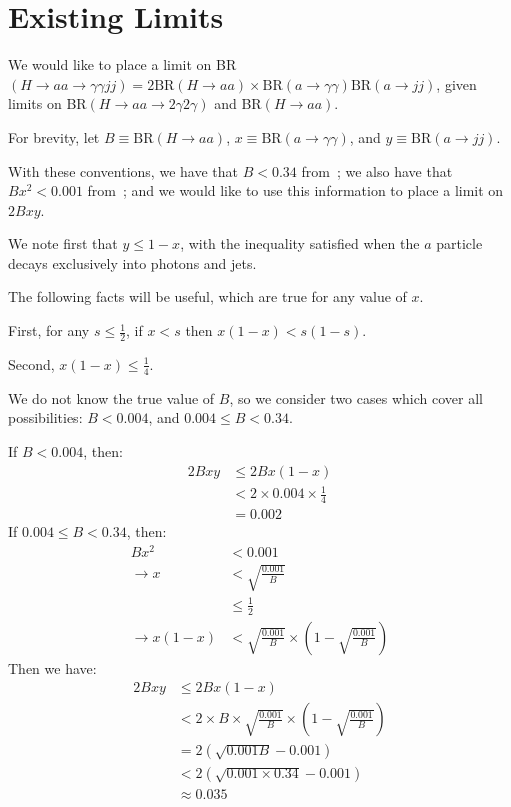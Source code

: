 \section{Existing Limits}
\label{sec:HBSM_app:existinglimits}
We would like to place a limit on BR$(H\rightarrow aa\rightarrow \gamma\gamma jj) = 2\text{BR}(H\rightarrow aa)\times\text{BR}(a\rightarrow\gamma\gamma)\text{BR}(a\rightarrow jj)$,
given limits on BR$(H\rightarrow aa\rightarrow 2\gamma2\gamma)$ and BR$(H\rightarrow aa)$.

\smallskip
\noindent For brevity, let $B\equiv \text{BR}(H\rightarrow aa)$, $x\equiv \text{BR}(a\rightarrow\gamma\gamma)$, and $y\equiv \text{BR}(a\rightarrow jj)$.

\smallskip
\noindent With these conventions, we have that $B<0.34$ from~\cite{Khachatryan:2016vau}; we also have that $Bx^2<0.001$ from~\cite{Aad:2015bua}; and we would like to use this information to place a limit on $2Bxy$. 

\smallskip
\noindent We note first that $y\le 1-x$, with the inequality satisfied when the $a$ particle decays exclusively into photons and jets.

\smallskip
\noindent The following facts will be useful, which are true for any value of $x$.

\smallskip
\noindent First, for any $s\le\frac{1}{2}$, if $x<s$ then $x(1-x)<s(1-s)$.

\smallskip
\noindent Second, $x(1-x)\le \frac{1}{4}$.

\smallskip
\noindent We do not know the true value of $B$,
so we consider two cases which cover all possibilities: $B<0.004$, and $0.004\le B<0.34$.

\smallskip
\noindent If $B<0.004$, then:
\begin{align*}
2Bxy &\le 2Bx(1-x) \\
&<2\times0.004\times\frac{1}{4} \\
&=0.002
\end{align*}
\noindent If $0.004\le B<0.34$, then: 
\begin{align*}
Bx^2 &< 0.001\\
\rightarrow x&<\sqrt{\frac{0.001}{B}}\\
&\le \frac{1}{2}\\
\rightarrow x(1-x)&<\sqrt{\frac{0.001}{B}}\times\left(1-\sqrt{\frac{0.001}{B}}\right)
\end{align*}
\noindent Then we have: 
\begin{align*}
2Bxy &\le 2Bx(1-x) \\
&<2\times B\times\sqrt{\frac{0.001}{B}}\times\left(1-\sqrt{\frac{0.001}{B}}\right) \\
&=2(\sqrt{0.001B}-0.001)\\
&<2(\sqrt{0.001\times0.34}-0.001)\\
&\approx 0.035
\end{align*}

